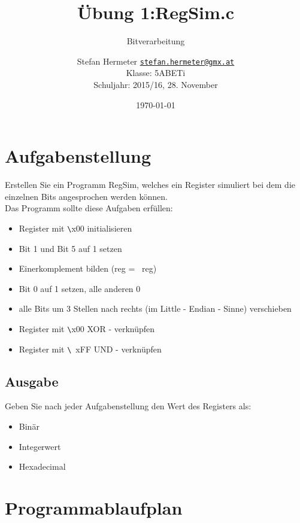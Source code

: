\documentclass{scrartcl}
\newcommand{\mytitle}{Übung 1}
\begin{document}
\title{\mytitle:RegSim.c}
\subtitle{Bitverarbeitung}
\date{\today}
\author{Stefan Hermeter \texttt{\href{mailto:stefan.hermeter@gmx.at}{stefan.hermeter@gmx.at}}\\
  Klasse: 5ABETi\\
  Schuljahr: 2015/16, 28. November}
\maketitle
{}
\newpage
\tableofcontents
\listoffigures
\newpage
{}
\section{Aufgabenstellung}
Erstellen Sie ein Programm RegSim, welches ein Register simuliert bei dem die einzelnen Bits angesprochen werden können.\\
Das Programm sollte diese Aufgaben erfüllen:

\begin{itemize}
\item Register mit  \verb|\|x00 initialisieren
\item Bit 1 und Bit 5 auf 1 setzen
\item Einerkomplement bilden (reg = ~reg)
\item Bit 0 auf 1 setzen, alle anderen 0
\item alle Bits um 3 Stellen nach rechts (im Little - Endian - Sinne) verschieben
\item Register mit \verb|\|x00 XOR - verknüpfen
\item Register mit  \verb|\|\ xFF UND - verknüpfen
\end{itemize}
  
\subsection{Ausgabe}
Geben Sie nach jeder Aufgabenstellung den Wert des Registers als:

\begin{itemize}
\item[1)] Binär
\item[2)] Integerwert
\item[3)] Hexadecimal
\end {itemize}

\section{Programmablaufplan}
\end{document}
